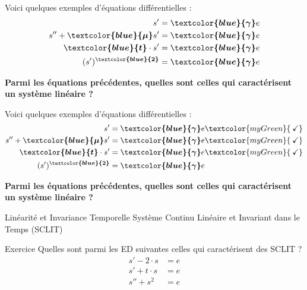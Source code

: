 \documentclass[a4paper,11pt]{beamer}
\newcounter{exampleBlockCounter}
\begin{document}
\begin{frame}
\justifying
Voici quelques exemples d'équations différentielles :
\setcounter{equation}{0}
\begin{align}
  s' &= \bm{\textcolor{blue}{\gamma}} e\\
  s''+ \bm{\textcolor{blue}{\mu}} s' &= \bm{\textcolor{blue}{\gamma}} e\\
  \bm{\textcolor{blue}{t}} \cdot s' &= \bm{\textcolor{blue}{\gamma}} e\\
  (s')^{\bm{\textcolor{blue}{2}}} &= \bm{\textcolor{blue}{\gamma}} e
\end{align}
\centering

\textcolor{myGreen}{\textbf{Parmi les équations précédentes, quelles sont celles
qui caractérisent un système linéaire ?}}
\end{frame}

\begin{frame}
\justifying
Voici quelques exemples d'équations différentielles :
\setcounter{equation}{0}
\begin{align}
  s' &= \bm{\textcolor{blue}{\gamma}} e \textcolor{myGreen}{\:\checkmark}\\
  s''+ \bm{\textcolor{blue}{\mu}} s' &= \bm{\textcolor{blue}{\gamma}}
  e \textcolor{myGreen}{\:\checkmark}\\
  \bm{\textcolor{blue}{t}} \cdot s' &= \bm{\textcolor{blue}{\gamma}}
  e\textcolor{myGreen}{\:\checkmark}\\
  (s')^{\bm{\textcolor{blue}{2}}} &= \bm{\textcolor{blue}{\gamma}} e 
\end{align}
\centering

\textcolor{myGreen}{\textbf{Parmi les équations précédentes, quelles sont celles
qui caractérisent un système linéaire ?}}
\end{frame}

\begin{frame}
\begin{alertblock}{Linéarité et Invariance Temporelle}
\center
Système Continu Linéaire et Invariant dans le Temps (SCLIT) 
\end{alertblock}
\begin{exampleblock}{Exercice }
\justifying
Quelles sont parmi les ED suivantes celles qui caractérisent des SCLIT ?
\setcounter{equation}{0}
\begin{align}
  s' - 2 \cdot s &= e \\
  s' + t \cdot s &= e \\
  s'' + s^2 &= e 
\end{align}
\end{exampleblock}
\end{frame}
\end{document}
